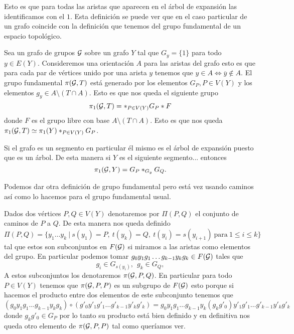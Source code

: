 \documentclass[tesis.tex]{subfiles}
\newcommand{\cG}{ {\cal G} }
\begin{document}
Esto es que para todas las aristas que aparecen en el árbol de expansión las identificamos con el $1$. 
Esta definición se puede ver que en el caso particular de un grafo coincide con la definición que tenemos del grupo fundamental de un espacio topológico.

\begin{ej}
Sea un grafo de grupos $\cal G$ sobre un grafo $Y$ tal que $G_y = \{ 1 \}$ para todo $y \in E(Y)$.
Consideremos una orientación $A$ para las aristas del grafo esto es que para cada par de vértices unido por una arista $y$ tenemos que $y \in A \iff \overline y \notin A$.
El grupo fundamental $\pi({\cal G}, T)$ está generado por los elementos $G_P, P \in V(Y)$ y los elementos $g_y \in A \setminus (T \cap A)$.
Esto es que nos queda el siguiente grupo
\[
\pi_1({\cal G}, T) = \ast_{P \in V(Y)} G_P \ast F
\]
donde $F$ es el grupo libre con base $A \setminus (T \cap A)$.
Esto es que nos queda $\pi_1({\cal G}, T) \simeq \pi_1(Y) \ast_{P \in V(Y)} G_P$.
\end{ej}

\begin{ej}
	Si el grafo es un segmento en particular él mismo es el árbol de expansión puesto que es un árbol.
	De esta manera si $Y$ es el siguiente segmento...
	entonces
	\[
	\pi_1({\cal G}, Y) = G_P \ast_{G_y} G_Q.
	\]
\end{ej}

Podemos dar otra definición de grupo fundamental pero está vez usando caminos así como lo hacemos para el grupo fundamental usual.

\medskip
Dados dos vértices $P,Q \in V(Y)$ denotaremos por $\Pi(P,Q)$ el conjunto de caminos de $P$ a $Q$.
De esta manera nos queda definido
\[
\Pi(P,Q) = \{  y_1 \dots y_k \ | \ s(y_1)=P, \ t(y_k) = Q, \ t(y_i) = s(y_{i+1})  \ \text{para} \ 1 \le i \le k \}
\]
tal que estos son subconjuntos en $F(\cG)$ si miramos a las aristas como elementos del grupo.
En particular podemos tomar $g_0y_1g_1 \dots g_{k-1}y_kg_k \in F(\cG)$ tales que
\[
g_i \in G_{s(y_i)}, \ \ g_k \in G_Q,
\]
A estos subconjuntos los denotaremos $\pi(\cG, P, Q)$. 
En particular para todo $P \in V(Y)$ tenemos que $\pi(\cG,P,P)$ es un subgrupo de $F(\cG)$ esto porque si hacemos el producto entre dos elementos de este subconjunto tenemos que
\begin{equation*}
	(g_0y_1g_1 \dots g_{k-1}y_kg_k ) \circ ( g'_0y'_1g'_1 \dots g'_{k-1}y'_kg'_k) =  g_0y_1g_1 \dots g_{k-1}y_k(g_kg'_0)y'_1g'_1 \dots g'_{k-1}y'_kg'_k
\end{equation*}
donde $g_kg'_0 \in G_P$ por lo tanto su producto está bien definido y en definitiva nos queda otro elemento de $\pi(\cG, P, P)$ tal como queríamos ver.
\end{document}
